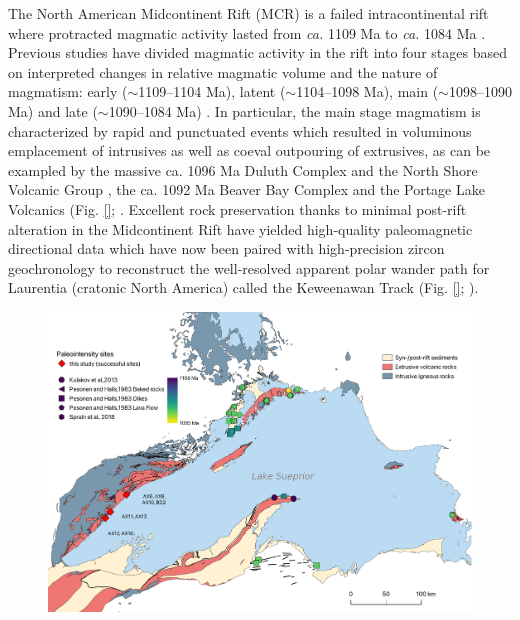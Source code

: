 \documentclass[draft]{agujournal2019}
\begin{document}
The North American Midcontinent Rift (MCR) is a failed intracontinental rift where protracted magmatic activity lasted from \textit{ca.} 1109 Ma to \textit{ca.} 1084 Ma \cite{Swanson-Hysell2019a}. Previous studies have divided magmatic activity in the rift into four stages based on interpreted changes in relative magmatic volume and the nature of magmatism: early ($\sim$1109–1104 Ma), latent ($\sim$1104–1098 Ma), main ($\sim$1098–1090 Ma) and late ($\sim$1090–1084 Ma) \cite{Vervoort2007a, Heaman2007a, Miller2013a}. In particular, the main stage magmatism is characterized by rapid and punctuated events which resulted in voluminous emplacement of intrusives as well as coeval outpouring of extrusives, as can be exampled by the massive ca. 1096 Ma Duluth Complex and the North Shore Volcanic Group \cite{Swanson-Hysell2020a}, the ca. 1092 Ma Beaver Bay Complex and the Portage Lake Volcanics (Fig. \ref{}; . Excellent rock preservation thanks to minimal post-rift alteration in the Midcontinent Rift have yielded high-quality paleomagnetic directional data which have now been paired with high-precision zircon geochronology to reconstruct the well-resolved apparent polar wander path for Laurentia (cratonic North America) called the Keweenawan Track (Fig. \ref{}; ). 

\begin{figure}
\centering
\noindent\includegraphics[width=4.75 in]{Geologic_map.pdf}
\caption{\footnotesize{}}
\label{fig:Geologic_map}
\end{figure}
\end{document}
